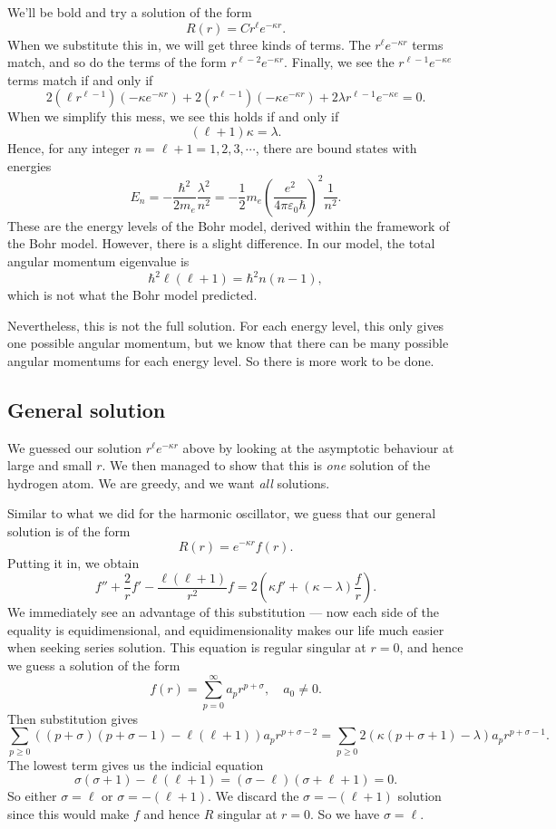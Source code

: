 \documentclass[a4paper]{article}
\begin{document}
We'll be bold and try a solution of the form
\[
  R(r) = C r^\ell e^{-\kappa r}.
\]
When we substitute this in, we will get three kinds of terms. The $r^\ell e^{-\kappa r}$ terms match, and so do the terms of the form $r^{\ell - 2} e^{-\kappa r}$. Finally, we see the $r^{\ell - 1}e^{-\kappa e}$ terms match if and only if
\[
  2(\ell r^{\ell - 1})(- \kappa e^{- \kappa r}) + 2 (r^{\ell - 1})(- \kappa e^{- \kappa r}) + 2\lambda r^{\ell - 1} e^{-\kappa e} = 0.
\]
When we simplify this mess, we see this holds if and only if
\[
  (\ell + 1) \kappa = \lambda.
\]
Hence, for any integer $n = \ell + 1 = 1, 2, 3, \cdots$, there are bound states with energies
\[
  E_n = -\frac{\hbar^2}{2 m_e} \frac{\lambda^2}{n^2} = -\frac{1}{2}m_e \left(\frac{e^2}{4 \pi \varepsilon_0 \hbar}\right)^2 \frac{1}{n^2}.
\]
These are the energy levels of the Bohr model, derived within the framework of the Bohr model. However, there is a slight difference. In our model, the total angular momentum eigenvalue is
\[
  \hbar^2 \ell(\ell + 1) = \hbar^2 n(n - 1),
\]
which is not what the Bohr model predicted.

Nevertheless, this is not the full solution. For each energy level, this only gives one possible angular momentum, but we know that there can be many possible angular momentums for each energy level. So there is more work to be done.

\subsection{General solution}
We guessed our solution $r^\ell e^{-\kappa r}$ above by looking at the asymptotic behaviour at large and small $r$. We then managed to show that this is \emph{one} solution of the hydrogen atom. We are greedy, and we want \emph{all} solutions.

Similar to what we did for the harmonic oscillator, we guess that our general solution is of the form
\[
  R(r) = e^{-\kappa r} f(r).
\]
Putting it in, we obtain
\[
  f'' + \frac{2}{r} f' - \frac{\ell(\ell + 1)}{r^2}f = 2\left(\kappa f' + (\kappa - \lambda)\frac{f}{r}\right).
\]
We immediately see an advantage of this substitution --- now each side of the equality is equidimensional, and equidimensionality makes our life much easier when seeking series solution. This equation is regular singular at $r = 0$, and hence we guess a solution of the form
\[
  f(r) = \sum_{p = 0}^\infty a_p r^{p + \sigma},\quad a_0 \not= 0.
\]
Then substitution gives
\[
  \sum_{p \geq 0} ((p + \sigma)(p + \sigma - 1) - \ell(\ell + 1)) a_p r^{p + \sigma - 2} = \sum_{p \geq 0} 2(\kappa(p + \sigma + 1)- \lambda)a_p r^{p + \sigma - 1}.
\]
The lowest term gives us the indicial equation
\[
  \sigma(\sigma + 1) - \ell(\ell + 1) = (\sigma - \ell)(\sigma + \ell + 1) = 0.
\]
So either $\sigma = \ell$ or $\sigma = -(\ell + 1)$. We discard the $\sigma = -(\ell + 1)$ solution since this would make $f$ and hence $R$ singular at $r = 0$. So we have $\sigma = \ell$.
\end{document}
